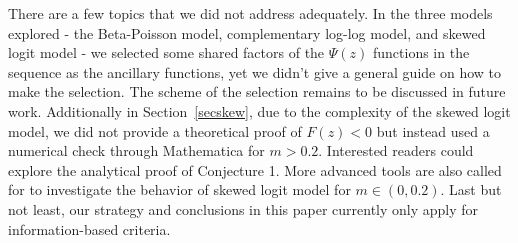 \documentclass[12pt]{TD-CJS}
\begin{document}
There are a few topics that we did not address adequately. In the three models explored - the Beta-Poisson model, complementary log-log model, and skewed logit model - we selected some shared factors of the $\Psi(z)$ functions in the sequence as the ancillary functions, yet we didn't give a general guide on how to make the selection. The scheme of the selection remains to be discussed in future work. Additionally in Section~\ref{secskew}, due to the complexity of the skewed logit model, we did not provide a theoretical proof of $F(z)<0$ but instead used a numerical check through Mathematica for $m>0.2$. Interested readers could explore the analytical proof of Conjecture 1. More advanced tools are also called for to investigate the behavior of skewed logit model for $m\in (0,0.2)$. Last but not least, our strategy and conclusions in this paper currently only apply for information-based criteria. 


 




% 
%  
\end{document}
